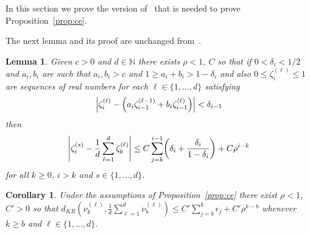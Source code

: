 \documentclass[10pt]{amsart}
\newtheorem{lemm}[theo]{Lemma}\newtheorem{prop}[theo]{Proposition}\newtheorem{coro}[theo]{Corollary}\newtheorem{conj}[theo]{Conjecture}
\theoremstyle{definition}\newtheorem{defi}[theo]{Definition}\newtheorem{rema}[theo]{Remark}\newtheorem{exam}[theo]{Example}\newtheorem{exem}[theo]{Example}\newtheorem{nota}[theo]{Notation}
\newcommand{\N}{\mathbb{N}}
\let\originalleft\left
\let\originalright\right
\renewcommand{\left}{\mathopen{}\mathclose\bgroup\originalleft}
\renewcommand{\right}{\aftergroup\egroup\originalright}
\begin{document}
In this section we prove the version of~\cite[Corollary~3.3]{MR4269425} that is needed to prove Proposition~\ref{prop:ce}.

The next lemma and its proof are unchanged from~\cite[Lemma~3.2]{MR4269425}.
\begin{lemm}\label{lemma:to:bary}
Given $c>0$ and $d \in \N$ there exists $\rho<1$, $C$ so that if $0 < \delta_i <1/2$ and $a_i, b_i$ are such that $a_i,b_i>c$ and $1\geq a_i+b_i>1-\delta_i$ and also $0 \le \zeta_i^{(\ell)}\le 1$ are sequences of real numbers for each $\ell \in \{1,\dots,d\}$ satisfying
\begin{equation}\label{eq:gammas:assumption}
\left|\zeta_i^{(\ell)}-\left(a_i\zeta_{i-1}^{(\ell-1)}+b_i\zeta_{i-1}^{(\ell)}\right)\right|<\delta_{i-1}
\end{equation}
then
\[
\left|\zeta_i^{(s)}-\frac 1 d \sum_{\ell=1}^d\zeta_k^{(\ell)}\right|\leq
C\sum_{j=k}^{i-1}\left(\delta_i+\frac{\delta_i}{1-\delta_i}\right)+C\rho^{i-k}
\]
for
all $k \ge 0$, $i>k$ and $s \in \{1,\dots,d\}$.
\end{lemm}

\begin{coro}\label{cor:to:bary}
Under the assumptions of Proposition~\ref{prop:ce} there exist $ \rho<1$, $C'>0$ so that $d_{KR}(\nu_k^{(\ell)},\frac 1 d\sum_{\ell=1}^d \nu_{b}^{(\ell)})\leq C'\sum_{j=b}^k\epsilon_j +C'\rho^{k-b}$ whenever $k\geq b$ and $\ell\in \{1,\dots,d\}$.
\end{coro}
\end{document}
